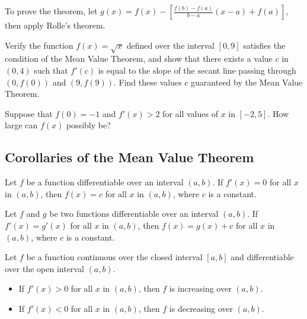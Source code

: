 To prove the theorem, let
\(g(x)=f(x) - [\frac{f(b) - f(a)}{b - a}(x - a)+f(a)]\), then apply Rolle's
theorem.

\begin{example}

Verify the function \(f(x)=\sqrt{x}\) defined over the interval
\([0,9]\) satisfies the condition of the Mean Value Theorem, and show
that there exists a value \(c\) in \((0,4)\) such that \(f'(c)\) is
equal to the slope of the secant line passing through \((0,f(0))\) and
\((9,f(9))\). Find these values \(c\) guaranteed by the Mean Value
Theorem.

\end{example}
\vspace*{6\baselineskip}

\begin{example}

Suppose that \(f(0)=-1\) and \(f'(x)>2\) for all values of \(x\) in
\([-2, 5]\). How large can \(f(x)\) possibly be?

\end{example}
\vspace*{6\baselineskip}

\hypertarget{corollaries-of-the-mean-value-theorem}{%
\subsection{Corollaries of the Mean Value
Theorem}\label{corollaries-of-the-mean-value-theorem}}

\begin{corollary}

Let \(f\) be a function differentiable over an interval \((a, b)\). If
\(f'(x)=0\) for all \(x\) in \((a, b)\), then \(f(x)=c\) for all \(x\)
in \((a, b)\), where \(c\) is a constant.

\end{corollary}

\begin{corollary}

Let \(f\) and \(g\) be two functions differentiable over an interval
\((a, b)\). If \(f'(x)=g'(x)\) for all \(x\) in \((a, b)\), then
\(f(x)=g(x)+c\) for all \(x\) in \((a, b)\), where \(c\) is a constant.

\end{corollary}

\begin{corollary}

Let \(f\) be a function continuous over the closed interval \([a,b]\)
and differentiable over the open interval \((a,b)\).

\begin{itemize}
\item
  If \(f'(x)>0\) for all \(x\) in \((a, b)\), then \(f\) is increasing
  over \((a, b)\).
\item
  If \(f'(x)<0\) for all \(x\) in \((a, b)\), then \(f\) is decreasing
  over \((a, b)\).
\end{itemize}

\end{corollary}


